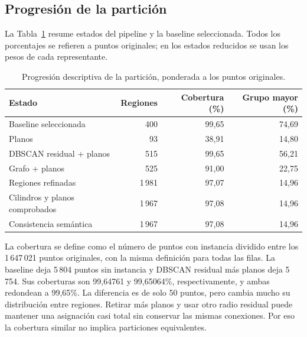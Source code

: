 \documentclass[journal,onecolumn]{IEEEtran}
\begin{document}
\subsection{Progresión de la partición}
La Tabla~\ref{tab:progresion} resume estados del pipeline y la baseline seleccionada. Todos los porcentajes se refieren a puntos originales; en los estados reducidos se usan los pesos de cada representante.
\begin{table}[H]
\centering\caption{Progresión descriptiva de la partición, ponderada a los puntos originales.}\label{tab:progresion}
\small
\begin{tabular}{lrrr}\toprule
Estado & Regiones & Cobertura (\%) & Grupo mayor (\%)\\\midrule
Baseline seleccionada & 400 & 99,65 & 74,69\\
Planos & 93 & 38,91 & 14,80\\
DBSCAN residual + planos & 515 & 99,65 & 56,21\\
Grafo + planos & 525 & 91,00 & 22,75\\
Regiones refinadas & 1\,981 & 97,07 & 14,96\\
Cilindros y planos comprobados & 1\,967 & 97,08 & 14,96\\
Consistencia semántica & 1\,967 & 97,08 & 14,96\\
\bottomrule\end{tabular}
\end{table}

La cobertura se define como el número de puntos con instancia dividido entre los 1\,647\,021 puntos originales, con la misma definición para todas las filas. La baseline deja 5\,804 puntos sin instancia y DBSCAN residual más planos deja 5\,754. Sus coberturas son 99,64761 y 99,65064\%, respectivamente, y ambas redondean a 99,65\%. La diferencia es de solo 50 puntos, pero cambia mucho su distribución entre regiones. Retirar más planos y usar otro radio residual puede mantener una asignación casi total sin conservar las mismas conexiones. Por eso la cobertura similar no implica particiones equivalentes.
\end{document}
